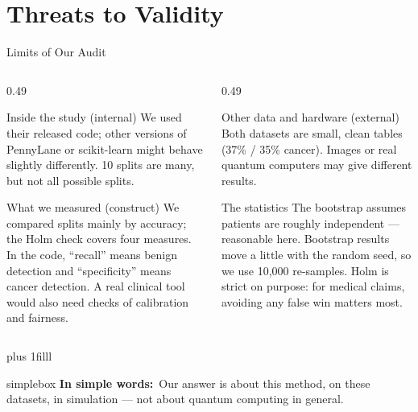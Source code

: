 \documentclass[aspectratio=169,11pt,t,xcolor={table}]{beamer}
\newcommand{\insimple}[1]{%
  \par\vskip 0pt plus 1filll
  \begin{beamercolorbox}[wd=\textwidth,sep=4pt,rounded=true]{simplebox}%
    \small\textbf{\textcolor{qamber!75!black}{In simple words:}}\ #1%
  \end{beamercolorbox}\vskip1pt}
\newcommand{\secquestion}{}
\begin{document}
\renewcommand{\secquestion}{Where could we be wrong?}
\section{Threats to Validity}

\begin{frame}{Limits of Our Audit}
  \begin{columns}[T,onlytextwidth]
    \begin{column}{0.49\textwidth}
      \begin{block}{Inside the study (internal)}
        \footnotesize We used their released code; other versions of PennyLane or scikit-learn might behave slightly differently. 10 splits are many, but not all possible splits.
      \end{block}
      \begin{block}{What we measured (construct)}
        \footnotesize We compared splits mainly by accuracy; the Holm check covers four measures. In the code, ``recall'' means benign detection and ``specificity'' means cancer detection. A real clinical tool would also need checks of calibration and fairness.
      \end{block}
    \end{column}
    \begin{column}{0.49\textwidth}
      \begin{block}{Other data and hardware (external)}
        \footnotesize Both datasets are small, clean tables (37\% / 35\% cancer). Images or real quantum computers may give different results.
      \end{block}
      \begin{block}{The statistics}
        \footnotesize The bootstrap assumes patients are roughly independent --- reasonable here. Bootstrap results move a little with the random seed, so we use 10,000 re-samples. Holm is strict on purpose: for medical claims, avoiding any false win matters most.
      \end{block}
    \end{column}
  \end{columns}
  \insimple{Our answer is about this method, on these datasets, in simulation --- not about quantum computing in general.}
\end{frame}

\renewcommand{\secquestion}{What should the field take away?}
\end{document}
